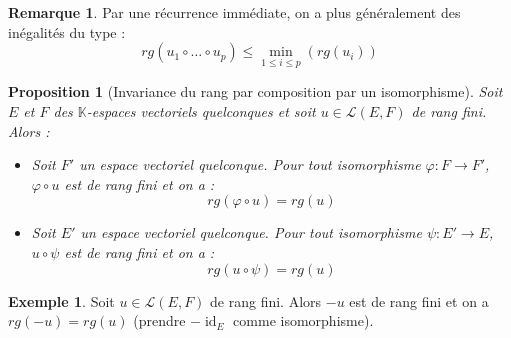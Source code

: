 \documentclass[french]{book}
\newcommand{\K}{\mathbb{K}}
\theoremstyle{plain}
\newtheorem{prop}{Proposition}[chapter]
\theoremstyle{definition}
\newtheorem{exa}{Exemple}[chapter]
\newtheorem{rmq}{Remarque}[chapter]
\theoremstyle{remark}
\DeclareMathOperator{\id}{id}
\begin{document}
\begin{rmq}
	Par une récurrence immédiate, on a plus généralement des inégalités du type : $$rg(u_1\circ\ldots\circ u_p)\leqslant\underset{1\leqslant i\leqslant p}{\min}(rg(u_i))$$
\end{rmq}
\begin{prop}[Invariance du rang par composition par un isomorphisme]
	Soit $E$ et $F$ des $\K$-espaces vectoriels quelconques et soit $u\in\mathcal{L}(E,F)$ de rang fini. Alors : \begin{itemize}
		\item Soit $F'$ un espace vectoriel quelconque. Pour tout isomorphisme $\varphi:F\rightarrow F'$, $\varphi\circ u$ est de rang fini et on a : $$rg(\varphi\circ u)=rg(u)$$
		\item Soit $E'$ un espace vectoriel quelconque. Pour tout isomorphisme $\psi:E'\rightarrow E$, $u\circ\psi$ est de rang fini et on a : $$rg(u\circ\psi)=rg(u)$$
	\end{itemize}
\end{prop}
\begin{exa}
	Soit $u\in\mathcal{L}(E,F)$ de rang fini. Alors $-u$ est de rang fini et on a $rg(-u)=rg(u)$ (prendre $-\id_E$ comme isomorphisme).
\end{exa}
\end{document}
